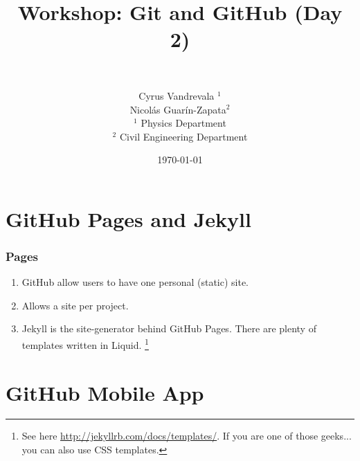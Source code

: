 


\title{Workshop: Git and GitHub (Day 2)}
\subtitle{~}
\author[AUTHOR]{\scriptsize{Cyrus Vandrevala $^1$\\Nicol\'as Guar\'in-Zapata$^2$}\\
\tiny{$^1$ Physics Department\\ $^2$ Civil Engineering Department}}
\date{\today}







\section[GitHub Pages]{GitHub Pages and Jekyll}

\begin{frame}
    \frametitle{Pages}
    
    \begin{enumerate}
    \item GitHub allow users to have one personal (static) site. \pause
    
    \item Allows a site per project. \pause
    
    \item Jekyll is the site-generator behind GitHub Pages. There are plenty of templates written in Liquid. \footnote{See here \url{http://jekyllrb.com/docs/templates/}. If you are one of those geeks... you can also use CSS templates.}

    \end{enumerate}
\end{frame}
      

\section[Mobile App]{GitHub Mobile App}

